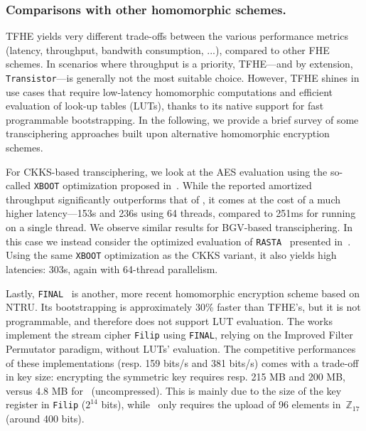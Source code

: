 \subsubsection{Comparisons with other homomorphic schemes.} 
TFHE yields very different trade-offs between the various performance metrics (latency, throughput, bandwith consumption, ...), compared to other FHE schemes. In scenarios where throughput is a priority, TFHE—and by extension, \texttt{Transistor}—is generally not the most suitable choice. However, TFHE shines in use cases that require low-latency homomorphic computations and efficient evaluation of look-up tables (LUTs), thanks to its native support for fast programmable bootstrapping.
In the following, we provide a brief survey of some transciphering approaches built upon alternative homomorphic encryption schemes.

For CKKS-based transciphering, we look at the AES evaluation using the so-called \texttt{XBOOT} optimization proposed in~\cite{EPRINT:NHYCKH25}. While the reported amortized throughput significantly outperforms that of \coolName, it comes at the cost of a much higher latency—153s and 236s using 64 threads, compared to 251ms for \coolName running on a single thread. We observe similar results for  BGV-based transciphering. In this case we instead consider the optimized evaluation of \texttt{RASTA}~\cite{C:DEGLLL18} presented in~\cite{EPRINT:NHYCKH25}. Using the same \texttt{XBOOT} optimization as the CKKS variant, it also yields high latencies: 303s, again with 64-thread parallelism. 


Lastly, \texttt{FINAL}~\cite{AC:BIPPS22} is another, more recent homomorphic encryption scheme based on NTRU. Its bootstrapping is approximately 30\% faster than TFHE’s, but it is not programmable, and therefore does not support LUT evaluation. The works~\cite{CiC:MeaParPer24,CCS:CDPP22} implement the stream cipher \texttt{Filip} using \texttt{FINAL}, relying on the Improved Filter Permutator paradigm, without LUTs' evaluation. The competitive performances of these implementations (resp. 159 bits/s and 381 bits/s) comes with a trade-off in key size: encrypting the symmetric key requires resp. 215 MB and 200 MB, versus 4.8 MB for \coolName~(uncompressed). This is mainly due to the size of the key register in \texttt{Filip} ($2^{14}$ bits), while \coolName~only requires the upload of 96 elements in~$\mathbb{Z}_{17}$ (around 400 bits).


